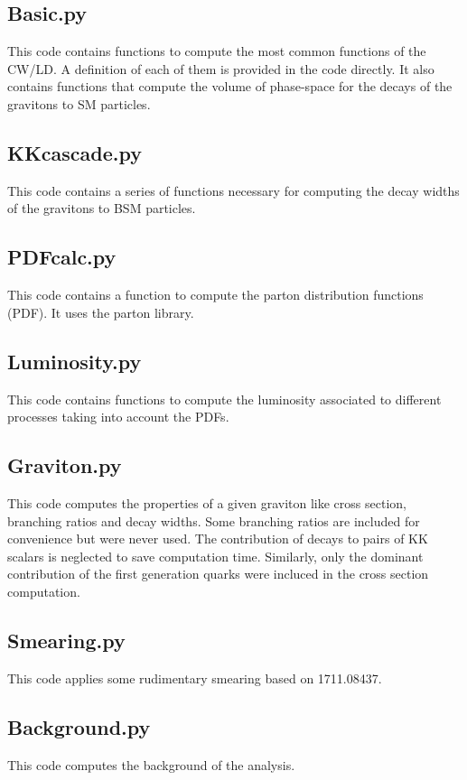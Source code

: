 \documentclass{article}
\begin{document}
\subsection{Basic.py}
This code contains functions to compute the most common functions of the CW/LD. A definition of each of them is provided in the code directly. It also contains functions that compute the volume of phase-space for the decays of the gravitons to SM particles.

\subsection{KKcascade.py}
This code contains a series of functions necessary for computing the decay widths of the gravitons to BSM particles.

\subsection{PDFcalc.py}
This code contains a function to compute the parton distribution functions (PDF). It uses the parton library.

\subsection{Luminosity.py}
This code contains functions to compute the luminosity associated to different processes taking into account the PDFs.

\subsection{Graviton.py}
This code computes the properties of a given graviton like cross section, branching ratios and decay widths. Some branching ratios are included for convenience but were never used. The contribution of decays to pairs of KK scalars is neglected to save computation time. Similarly, only the dominant contribution of the first generation quarks were incluced in the cross section computation.

\subsection{Smearing.py}
This code applies some rudimentary smearing based on 1711.08437.

\subsection{Background.py}
This code computes the background of the analysis.
\end{document}
